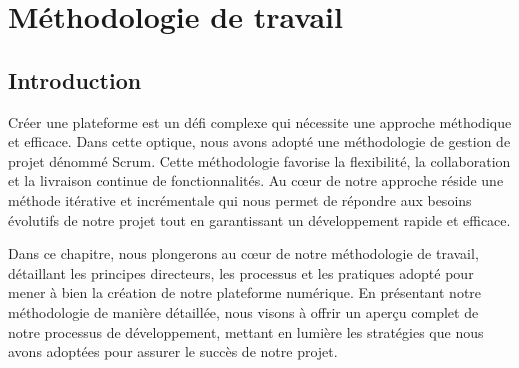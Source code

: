 \chapter{Méthodologie de travail}
\begin{spacing}{1.2}
\minitoc
\thispagestyle{MyStyle}
\end{spacing}
\newpage

\section*{Introduction}
Créer une plateforme est un défi complexe qui nécessite une approche méthodique et efficace. Dans cette optique, nous avons adopté une méthodologie de gestion de projet dénommé Scrum. Cette méthodologie favorise la flexibilité, la collaboration et la livraison continue de fonctionnalités. Au cœur de notre approche réside une méthode itérative et incrémentale qui nous permet de répondre aux besoins évolutifs de notre projet tout en garantissant un développement rapide et efficace.\par

Dans ce chapitre, nous plongerons au cœur de notre méthodologie de travail, détaillant les principes directeurs, les processus et les pratiques adopté pour mener à bien la création de notre plateforme numérique. En présentant notre méthodologie de manière détaillée, nous visons à offrir un aperçu complet de notre processus de développement, mettant en lumière les stratégies que nous avons adoptées pour assurer le succès de notre projet.
\par
